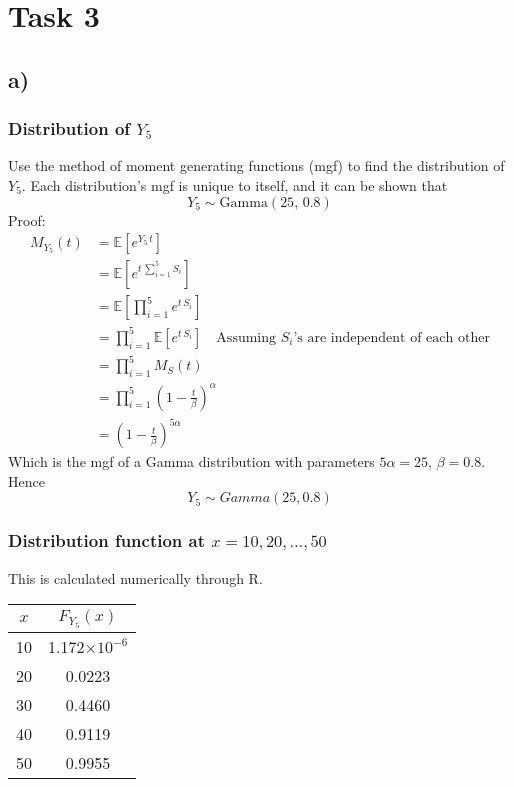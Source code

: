 \documentclass[titlepage]{article}
\begin{document}
	\section{Task 3} 
	\subsection{a)}
	\subsubsection{Distribution of $Y_5$}
	Use the method of moment generating functions (mgf) to find the distribution of $Y_5$. Each distribution's mgf is unique to itself, and it can be shown that
	$$Y_5 \sim \text{Gamma}(25, \, 0.8)$$
	Proof:
	\begin{align*}
		M_{Y_{5}}(t) &= \mathbb{E}\left[e^{Y_5\,t}\right]\\
		&=\mathbb{E}\left[e^{t\,\sum_{i = 1}^{5}S_i}\right]\\
		&=\mathbb{E}\left[\prod_{i = 1}^{5}e^{t\,S_i}\right]\\
		&=\prod_{i = 1}^{5}\mathbb{E}\left[e^{t\,S_i}\right] \quad \text{Assuming $S_i$'s are independent of each other}\\
		&= \prod_{i = 1}^{5} M_S(t)\\
		&= \prod_{i = 1}^{5}\left(1 - \frac{t}{\beta}\right)^\alpha\\
		&= \left(1 - \frac{t}{\beta}\right)^{5\alpha}
	\end{align*}	
	Which is the mgf of a Gamma distribution with parameters $5\alpha = 25$, $\beta = 0.8$. Hence $$Y_5 \sim Gamma(25, 0.8)$$
	
	\subsubsection{Distribution function at $x = 10, 20, \ldots, 50$}
	This is calculated numerically through R.
	\begin{center}
		\begin{tabular}{ |c|c|} 
			\hline
			$x$ & $F_{Y_5}(x) $\\ 
			\hline
			10 & 1.172$\times 10 ^{-6}$ \\ 
			20 & 0.0223 \\ 
			30 & 0.4460 \\ 
			40 & 0.9119 \\ 
			50 & 0.9955 \\
			\hline
		\end{tabular}
	\end{center}
\end{document}
